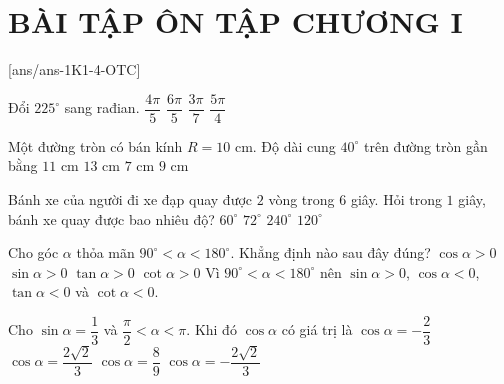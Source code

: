 
\notename
\NOTE \anLG \anDA 

\section*{BÀI TẬP ÔN TẬP CHƯƠNG I}
[ans/ans-1K1-4-OTC]
\begin{ex}%
	Đổi $225^\circ$ sang rađian.
	\choice
	{$\dfrac{4\pi}{5}$}
	{$\dfrac{6\pi}{5}$}
	{$\dfrac{3\pi}{7}$}
	{\True $\dfrac{5\pi}{4}$}
\end{ex}
\begin{ex}%
	Một đường tròn có bán kính $R=10$ cm. Độ dài cung $40^\circ$ trên đường tròn gần bằng
	\choice
	{$11$ cm}
	{$13$ cm}
	{\True $7$ cm}
	{$9$ cm}
\end{ex}
\begin{ex}%
	Bánh xe của người đi xe đạp quay được $2$ vòng trong $6$ giây. Hỏi trong $1$ giây, bánh xe quay được bao nhiêu độ?
	\choice
	{$60^\circ$}
	{$72^\circ$}
	{$240^\circ$}
	{\True $120^\circ$}
\end{ex}
\begin{ex}%
	Cho góc $\alpha$ thỏa mãn $90^\circ <\alpha <180^\circ$. Khẳng định nào sau đây đúng?
	\choice
	{$\cos\alpha>0$}
	{\True $\sin\alpha>0$}
	{$\tan\alpha>0$}
	{$\cot\alpha>0$}
	\loigiai
	{Vì $90^\circ <\alpha <180^\circ$ nên $\sin\alpha>0$, $\cos\alpha<0$, $\tan\alpha<0$ và $\cot\alpha<0$.}
\end{ex}
\begin{ex}%
	Cho $\sin \alpha =\dfrac{1}{3}$ và $\dfrac{\pi}{2}<\alpha<\pi$. Khi đó $\cos \alpha$ có giá trị là
	\choice
	{$\cos \alpha =-\dfrac{2}{3}$}
	{$\cos \alpha =\dfrac{2\sqrt{2}}{3}$}
	{$\cos \alpha =\dfrac{8}{9}$}
	{\True $\cos \alpha =-\dfrac{2\sqrt{2}}{3}$}
\end{ex}
